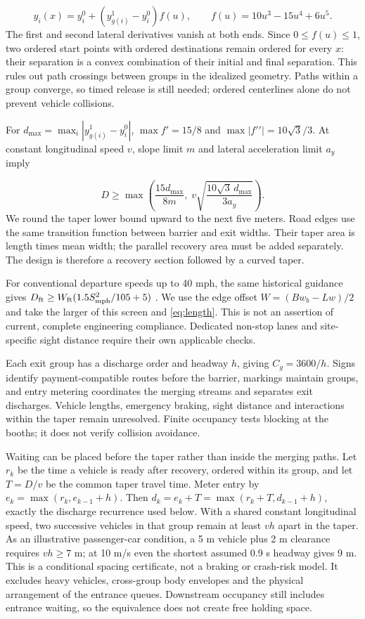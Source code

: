 \documentclass[12pt,letterpaper]{article}
\begin{document}
\begin{equation}
y_i(x)=y_i^0+(y_{g(i)}^1-y_i^0)f(u),\qquad
f(u)=10u^3-15u^4+6u^5.\label{eq:path}
\end{equation}
The first and second lateral derivatives vanish at both ends. Since $0\le f(u)\le1$, two ordered start points with ordered destinations remain ordered for every $x$: their separation is a convex combination of their initial and final separation. This rules out path crossings between groups in the idealized geometry. Paths within a group converge, so timed release is still needed; ordered centerlines alone do not prevent vehicle collisions.

For $d_{\max}=\max_i|y_{g(i)}^1-y_i^0|$, $\max f\prime=15/8$ and $\max|f\prime\prime|=10\sqrt3/3$. At constant longitudinal speed $v$, slope limit $m$ and lateral acceleration limit $a_y$ imply

\begin{equation}
D\ge\max\left(\frac{15d_{\max}}{8m},\;v\sqrt{\frac{10\sqrt3\,d_{\max}}{3a_y}}\right).\label{eq:length}
\end{equation}
We round the taper lower bound upward to the next five meters. Road edges use the same transition function between barrier and exit widths. Their taper area is length times mean width; the parallel recovery area must be added separately. The design is therefore a recovery section followed by a curved taper.

For conventional departure speeds up to 40 mph, the same historical guidance gives $D_{\rm ft}\ge W_{\rm ft}(1.5S_{\rm mph}^2/105+5)$ \cite{departure}. We use the edge offset $W=(Bw_b-Lw)/2$ and take the larger of this screen and \eqref{eq:length}. This is not an assertion of current, complete engineering compliance. Dedicated non-stop lanes and site-specific sight distance require their own applicable checks.

Each exit group has a discharge order and headway $h$, giving $C_g=3600/h$. Signs identify payment-compatible routes before the barrier, markings maintain groups, and entry metering coordinates the merging streams and separates exit discharges. Vehicle lengths, emergency braking, sight distance and interactions within the taper remain unresolved. Finite occupancy tests blocking at the booths; it does not verify collision avoidance.

Waiting can be placed before the taper rather than inside the merging paths. Let $r_k$ be the time a vehicle is ready after recovery, ordered within its group, and let $T=D/v$ be the common taper travel time. Meter entry by $e_k=\max(r_k,e_{k-1}+h)$. Then $d_k=e_k+T=\max(r_k+T,d_{k-1}+h)$, exactly the discharge recurrence used below. With a shared constant longitudinal speed, two successive vehicles in that group remain at least $vh$ apart in the taper. As an illustrative passenger-car condition, a 5 m vehicle plus 2 m clearance requires $vh\ge7$ m; at 10 m/s even the shortest assumed 0.9 s headway gives 9 m. This is a conditional spacing certificate, not a braking or crash-risk model. It excludes heavy vehicles, cross-group body envelopes and the physical arrangement of the entrance queues. Downstream occupancy still includes entrance waiting, so the equivalence does not create free holding space.
\end{document}
